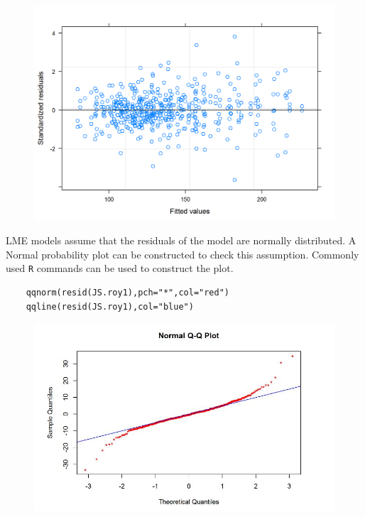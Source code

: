 \begin{figure}[h!]
	\centering
	\includegraphics[width=0.9\linewidth]{images/ResidPlot1}
	\caption{}
	\label{fig:ResidPlot1}
\end{figure}
LME models assume that the residuals of the model are normally distributed. A Normal probability plot can be constructed to check this assumption. Commonly used \texttt{R} commands can be used to construct the plot.
\newpage

\begin{framed}
	\begin{verbatim}
	qqnorm(resid(JS.roy1),pch="*",col="red")
	qqline(resid(JS.roy1),col="blue")
	\end{verbatim}
\end{framed}




\begin{figure}[h!]
	\centering
	\includegraphics[width=0.7\linewidth]{images/Resid-newplot}
	\caption{}
	\label{fig:Resid-newplot}
\end{figure}

